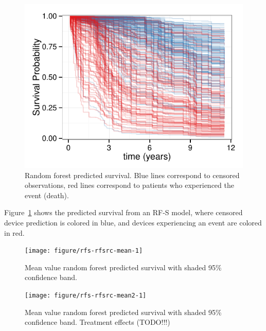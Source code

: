 \documentclass[nojss]{jss}\usepackage[]{graphicx}\usepackage[]{color}
\makeatletter
\def\maxwidth{ %
  \ifdim\Gin@nat@width>\linewidth
    \linewidth
  \else
    \Gin@nat@width
  \fi
}
\makeatother
\begin{document}
\begin{Schunk}
\begin{figure}[!htpb]

{\centering \includegraphics[width=\maxwidth]{figure/rfs-rfsrc-plot-1} 

}

\caption[Random forest predicted survival]{Random forest predicted survival. Blue lines correspond to censored observations, red lines correspond to patients who experienced the event (death).\label{fig:rfsrc-plot}}
\end{figure}
\end{Schunk}


Figure~\ref{fig:rfsrc-plot} shows the predicted survival from an RF-S model, where censored device prediction is colored in blue, and devices experiencing an event are colored in red. 

\begin{Schunk}
\begin{figure}[!htpb]

{\centering \texttt{[image: figure/rfs-rfsrc-mean-1]} 

}

\caption[Mean value random forest predicted survival with shaded 95\% confidence band]{Mean value random forest predicted survival with shaded 95\% confidence band.\label{fig:rfsrc-mean}}
\end{figure}
\end{Schunk}

\begin{Schunk}
\begin{figure}[!htpb]

{\centering \texttt{[image: figure/rfs-rfsrc-mean2-1]} 

}

\caption[Mean value random forest predicted survival with shaded 95\% confidence band]{Mean value random forest predicted survival with shaded 95\% confidence band. Treatment effects (TODO!!!)\label{fig:rfsrc-mean2}}
\end{figure}
\end{Schunk}
\end{document}
